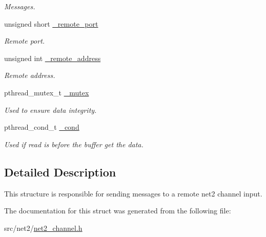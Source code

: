 \begin{DoxyCompactItemize}
\begin{DoxyCompactList}\small\item\em Messages. \end{DoxyCompactList}\item 
\hypertarget{structnet2__channel__output__t_a7236b85d69d9c17a6d11d830c191096a}{}unsigned short \hyperlink{structnet2__channel__output__t_a7236b85d69d9c17a6d11d830c191096a}{\+\_\+remote\+\_\+port}\label{structnet2__channel__output__t_a7236b85d69d9c17a6d11d830c191096a}

\begin{DoxyCompactList}\small\item\em Remote port. \end{DoxyCompactList}\item 
\hypertarget{structnet2__channel__output__t_aed3ee28ef3dd928ad8735a44187e6016}{}unsigned int \hyperlink{structnet2__channel__output__t_aed3ee28ef3dd928ad8735a44187e6016}{\+\_\+remote\+\_\+address}\label{structnet2__channel__output__t_aed3ee28ef3dd928ad8735a44187e6016}

\begin{DoxyCompactList}\small\item\em Remote address. \end{DoxyCompactList}\item 
\hypertarget{structnet2__channel__output__t_a440374b4242121a1dafbe2f457264b15}{}pthread\+\_\+mutex\+\_\+t \hyperlink{structnet2__channel__output__t_a440374b4242121a1dafbe2f457264b15}{\+\_\+mutex}\label{structnet2__channel__output__t_a440374b4242121a1dafbe2f457264b15}

\begin{DoxyCompactList}\small\item\em Used to ensure data integrity. \end{DoxyCompactList}\item 
\hypertarget{structnet2__channel__output__t_ab87a0f05e9a6580b15fb5e9fc21e2142}{}pthread\+\_\+cond\+\_\+t \hyperlink{structnet2__channel__output__t_ab87a0f05e9a6580b15fb5e9fc21e2142}{\+\_\+cond}\label{structnet2__channel__output__t_ab87a0f05e9a6580b15fb5e9fc21e2142}

\begin{DoxyCompactList}\small\item\em Used if read is before the buffer get the data. \end{DoxyCompactList}\end{DoxyCompactItemize}


\subsection{Detailed Description}
This structure is responsible for sending messages to a remote net2 channel input. 

The documentation for this struct was generated from the following file\+:\begin{DoxyCompactItemize}
\item 
src/net2/\hyperlink{net2__channel_8h}{net2\+\_\+channel.\+h}\end{DoxyCompactItemize}
